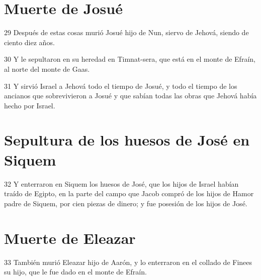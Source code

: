 \section*{Muerte de Josué}

\par 29 Después de estas cosas murió Josué hijo de Nun, siervo de Jehová, siendo de ciento diez años.
\par 30 Y le sepultaron en su heredad en Timnat-sera, que está en el monte de Efraín, al norte del monte de Gaas.
\par 31 Y sirvió Israel a Jehová todo el tiempo de Josué, y todo el tiempo de los ancianos que sobrevivieron a Josué y que sabían todas las obras que Jehová había hecho por Israel.

\section*{Sepultura de los huesos de José en Siquem}

\par 32 Y enterraron en Siquem los huesos de José, que los hijos de Israel habían traído de Egipto, en la parte del campo que Jacob compró de los hijos de Hamor padre de Siquem, por cien piezas de dinero; y fue posesión de los hijos de José.

\section*{Muerte de Eleazar}

\par 33 También murió Eleazar hijo de Aarón, y lo enterraron en el collado de Finees su hijo, que le fue dado en el monte de Efraín.


